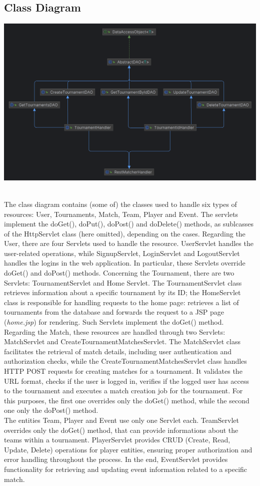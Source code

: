 \subsection{Class Diagram}

\includegraphics[width = \linewidth]{sections/BLL/ClassDiagram.png}\\\

\noindent The class diagram contains (some of) the classes used to handle six types of resources: User, Tournaments, Match, Team, Player and Event. The servlets implement the doGet(), doPut(), doPost() and doDelete() methods, as sublcasses of the HttpServlet class (here omitted), depending on the cases.
Regarding the User, there are four Servlets used to handle the resource.
UserServlet handles the user-related operations, while SignupServlet, LoginServlet and LogoutServlet handles the logins in
the web application. In particular, these Servlets override doGet() and doPost() methods. 
Concerning the Tournament, there are two Servlets: TournamentServlet and Home Servlet. The TournamentServlet class retrieves information about a specific tournament by its ID; the HomeServlet class is responsible for handling requests to the home page: retrieves a list of tournaments from the database and forwards the request to a JSP page (\textit{home.jsp}) for rendering.
Such Servlets implement the doGet() method.
Regarding the Match, these resources are handled through two Servlets: MatchServlet and CreateTournamentMatchesServlet. The MatchServlet class facilitates the retrieval of match details, including user authentication and authorization checks, while the CreateTournamentMatchesServlet class handles HTTP POST requests for creating matches for a tournament. It validates the URL format, checks if the user is logged in, verifies if the logged user has access to the tournament and executes a match creation job for the tournament. For this purposes, the first one overrides only the doGet() method, while the second one only the doPost() method.\\
The entities Team, Player and Event use only one Servlet each. TeamServlet overrides only the doGet() method, that can provide informations about the teams within a tournament.
PlayerServlet provides CRUD (Create, Read, Update, Delete) operations for player entities, ensuring proper authorization and error handling throughout the process.
In the end, EventServlet provides functionality for retrieving and updating event information related to a specific match.